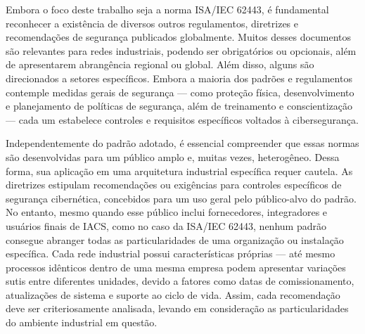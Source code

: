         Embora o foco deste trabalho seja a norma ISA/IEC 62443, é fundamental reconhecer a existência de diversos outros regulamentos, diretrizes e recomendações de segurança publicados globalmente. Muitos desses documentos são relevantes para redes industriais, podendo ser obrigatórios ou opcionais, além de apresentarem abrangência regional ou global. Além disso, alguns são direcionados a setores específicos. Embora a maioria dos padrões e regulamentos contemple medidas gerais de segurança — como proteção física, desenvolvimento e planejamento de políticas de segurança, além de treinamento e conscientização — cada um estabelece controles e requisitos específicos voltados à cibersegurança.

        Independentemente do padrão adotado, é essencial compreender que essas normas são desenvolvidas para um público amplo e, muitas vezes, heterogêneo. Dessa forma, sua aplicação em uma arquitetura industrial específica requer cautela. As diretrizes estipulam recomendações ou exigências para controles específicos de segurança cibernética, concebidos para um uso geral pelo público-alvo do padrão. No entanto, mesmo quando esse público inclui fornecedores, integradores e usuários finais de IACS, como no caso da ISA/IEC 62443, nenhum padrão consegue abranger todas as particularidades de uma organização ou instalação específica. Cada rede industrial possui características próprias — até mesmo processos idênticos dentro de uma mesma empresa podem apresentar variações sutis entre diferentes unidades, devido a fatores como datas de comissionamento, atualizações de sistema e suporte ao ciclo de vida. Assim, cada recomendação deve ser criteriosamente analisada, levando em consideração as particularidades do ambiente industrial em questão.

